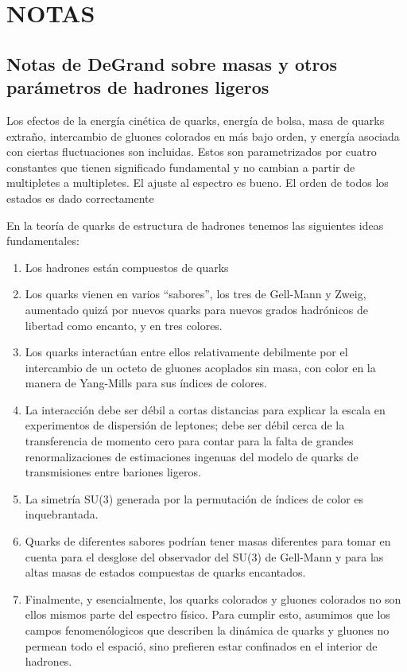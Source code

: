 \chapter{NOTAS}

\section{Notas de DeGrand sobre masas y otros parámetros de hadrones ligeros}

Los efectos de la energía cinética de quarks, energía de bolsa, masa de quarks extraño, intercambio de gluones colorados en más bajo orden, y energía asociada con ciertas fluctuaciones son incluidas. Estos son parametrizados por cuatro constantes que tienen significado fundamental y no cambian a partir de multipletes a multipletes. El ajuste al espectro es bueno. El orden de todos los estados es dado correctamente

En la teoría de quarks de estructura de hadrones tenemos las siguientes ideas fundamentales:

\begin{enumerate}
\item Los hadrones están compuestos de quarks
\item Los quarks vienen en varios ``sabores'', los tres de Gell-Mann y Zweig, aumentado quizá por nuevos quarks para nuevos grados hadrónicos de libertad como encanto, y en tres colores.
\item Los quarks interactúan entre ellos relativamente debilmente por el intercambio de un octeto de gluones acoplados sin masa, con color en la manera de Yang-Mills para sus índices de colores. 
\item La interacción debe ser débil a cortas distancias para explicar la escala en experimentos de dispersión de leptones; debe ser débil cerca de la transferencia de momento cero para contar para la falta de grandes renormalizaciones de estimaciones ingenuas del modelo de quarks de transmisiones entre bariones ligeros. 
\item La simetría SU(3) generada por la permutación de índices de color es inquebrantada. 
\item Quarks de diferentes sabores podrían tener masas diferentes para tomar en cuenta para el desglose del observador del SU(3) de Gell-Mann y para las altas masas de estados compuestas de quarks encantados.
\item Finalmente, y esencialmente, los quarks colorados y gluones colorados no son ellos mismos parte del espectro físico. Para cumplir esto, asumimos que los campos fenomenólogicos que describen la dinámica de quarks y gluones no permean todo el espació, sino prefieren estar confinados en el interior de hadrones.
\end{enumerate}

